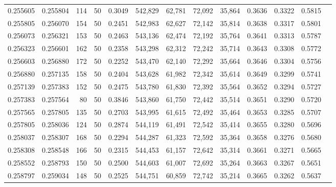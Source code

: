 \begin{tabular}{rrrrrrrrrrrrr}
0.255605 & 0.255804 &   114 &  50 &                                     0.3049 & 542,829 &  62,781 &  72,092 &  35,864 & 0.3636 & 0.3322 & 0.5815 \\
0.255805 & 0.256070 &   154 &  50 &                                     0.2451 & 542,983 &  62,627 &  72,142 &  35,814 & 0.3638 & 0.3317 & 0.5801 \\
0.256073 & 0.256321 &   153 &  50 &                                     0.2463 & 543,136 &  62,474 &  72,192 &  35,764 & 0.3641 & 0.3313 & 0.5787 \\
0.256323 & 0.256601 &   162 &  50 &                                     0.2358 & 543,298 &  62,312 &  72,242 &  35,714 & 0.3643 & 0.3308 & 0.5772 \\
0.256603 & 0.256880 &   172 &  50 &                                     0.2252 & 543,470 &  62,140 &  72,292 &  35,664 & 0.3646 & 0.3304 & 0.5756 \\
0.256880 & 0.257135 &   158 &  50 &                                     0.2404 & 543,628 &  61,982 &  72,342 &  35,614 & 0.3649 & 0.3299 & 0.5741 \\
0.257139 & 0.257383 &   152 &  50 &                                     0.2475 & 543,780 &  61,830 &  72,392 &  35,564 & 0.3652 & 0.3294 & 0.5727 \\
0.257383 & 0.257564 &    80 &  50 &                                     0.3846 & 543,860 &  61,750 &  72,442 &  35,514 & 0.3651 & 0.3290 & 0.5720 \\
0.257565 & 0.257805 &   135 &  50 &                                     0.2703 & 543,995 &  61,615 &  72,492 &  35,464 & 0.3653 & 0.3285 & 0.5707 \\
0.257805 & 0.258036 &   124 &  50 &                                     0.2874 & 544,119 &  61,491 &  72,542 &  35,414 & 0.3655 & 0.3280 & 0.5696 \\
0.258037 & 0.258307 &   168 &  50 &                                     0.2294 & 544,287 &  61,323 &  72,592 &  35,364 & 0.3658 & 0.3276 & 0.5680 \\
0.258308 & 0.258548 &   166 &  50 &                                     0.2315 & 544,453 &  61,157 &  72,642 &  35,314 & 0.3661 & 0.3271 & 0.5665 \\
0.258552 & 0.258793 &   150 &  50 &                                     0.2500 & 544,603 &  61,007 &  72,692 &  35,264 & 0.3663 & 0.3267 & 0.5651 \\
0.258797 & 0.259034 &   148 &  50 &                                     0.2525 & 544,751 &  60,859 &  72,742 &  35,214 & 0.3665 & 0.3262 & 0.5637 \\

\end{tabular}
